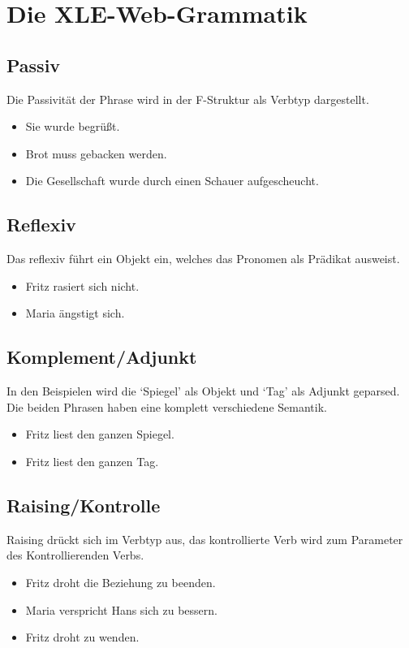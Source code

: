 \pagebreak
\section{Die XLE-Web-Grammatik}

\subsection{Passiv}
Die Passivität der Phrase wird in der F-Struktur als Verbtyp dargestellt.
\begin{itemize}
	\item Sie wurde begrüßt.
	\item Brot muss gebacken werden.	
	\item Die Gesellschaft wurde durch einen Schauer aufgescheucht.
\end{itemize}

\subsection{Reflexiv}
Das reflexiv führt ein Objekt ein, welches das Pronomen als Prädikat ausweist.
\begin{itemize}
	\item Fritz rasiert sich nicht.
	\item Maria ängstigt sich.
\end{itemize}

\subsection{Komplement/Adjunkt}
In den Beispielen wird die `Spiegel' als Objekt und `Tag' als Adjunkt geparsed.
Die beiden Phrasen haben eine komplett verschiedene Semantik.
\begin{itemize}
	\item Fritz liest den ganzen Spiegel.
	\item Fritz liest den ganzen Tag.
\end{itemize}


\subsection{Raising/Kontrolle}
Raising drückt sich im Verbtyp aus, das kontrollierte Verb wird zum Parameter des Kontrollierenden Verbs.
\begin{itemize}
	\item Fritz droht die Beziehung zu beenden.
	\item Maria verspricht Hans sich zu bessern.	
	\item Fritz droht zu wenden.
\end{itemize}

